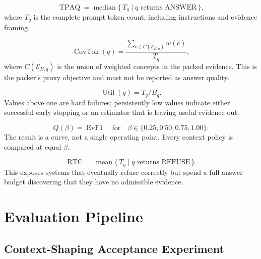 \begin{definition}
\label{def:tokens-per-answered-query}
\[
\operatorname{TPAQ} =
\operatorname{median}\{\,T_q \mid q\text{ returns ANSWER}\,\},
\]
where $T_q$ is the complete prompt token count, including instructions and
evidence framing.
\end{definition}

\begin{definition}
\label{def:coverage-per-token}
\[
\operatorname{CovTok}(q)=
\frac{\sum_{c\in C(\mathcal{E}_{B,q})}w(c)}{T_q},
\]
where $C(\mathcal{E}_{B,q})$ is the union of weighted concepts in the packed
evidence. This is the packer's proxy objective and must not be reported as
answer quality.
\end{definition}

\begin{definition}
\label{def:budget-utilisation}
\[
\operatorname{Util}(q)=T_q/B_q.
\]
Values above one are hard failures; persistently low values indicate either
successful early stopping or an estimator that is leaving useful evidence out.
\end{definition}

\begin{definition}
\label{def:quality-at-budget}
\[
Q(\beta)=\operatorname{EvF1}
\quad\text{for}\quad
\beta\in\{0.25,0.50,0.75,1.00\}.
\]
The result is a curve, not a single operating point. Every context policy is
compared at equal $\beta$.
\end{definition}

\begin{definition}
\label{def:refusal-token-cost}
\[
\operatorname{RTC} =
\operatorname{mean}\{\,T_q \mid q\text{ returns REFUSE}\,\}.
\]
This exposes systems that eventually refuse correctly but spend a full answer
budget discovering that they have no admissible evidence.
\end{definition}

\section{Evaluation Pipeline}
\label{sec:eval:pipeline}

\subsection{Context-Shaping Acceptance Experiment}
\label{sec:eval:context-ab}

